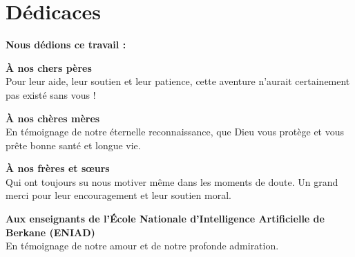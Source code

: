 \chapter*{Dédicaces}

\begin{center}
    \Huge \textbf{Nous dédions ce travail :}\\
    \vspace{2cm}
    
    \Large \textbf{À nos chers pères}\\
    \normalsize
    Pour leur aide, leur soutien et leur patience, cette aventure n'aurait certainement pas existé sans vous !\\
    \vspace{1.5cm}
    
    \Large \textbf{À nos chères mères}\\
    \normalsize
    En témoignage de notre éternelle reconnaissance, que Dieu vous protège et vous prête bonne santé et longue vie.\\
    \vspace{1.5cm}
    
    \Large \textbf{À nos frères et sœurs}\\
    \normalsize
    Qui ont toujours su nous motiver même dans les moments de doute. Un grand merci pour leur encouragement et leur soutien moral.\\
    \vspace{1.5cm}
    
    \Large \textbf{Aux enseignants de l'École Nationale d'Intelligence Artificielle de Berkane (ENIAD)}\\
    \normalsize
    En témoignage de notre amour et de notre profonde admiration.
\end{center}